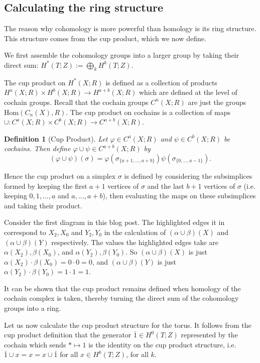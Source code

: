 \documentclass[12pt,a4paper]{article}
\newcommand{\Hom}{\text{Hom}}
\newtheorem{defin}{Definition}
\begin{document}
\subsection*{Calculating the ring structure}
The reason why cohomology is more powerful than homology is its ring structure. This structure comes from the cup product, which we now define.

We first assemble the cohomology groups into a larger group by taking their direct sum: $H^*(T;Z) := \bigoplus_{k} H^k(T;Z)$.

The cup product on $H^*(X;R)$ is defined as a collection of products $H^a(X;R) \times H^b(X;R) \rightarrow H^{a+b}(X;R)$ which are defined at the level of cochain groups. Recall that the cochain groups $C^n(X;R)$ are just the groups $\Hom(C_n(X),R)$. The cup product on cochains is a collection of maps $\cup : C^a(X;R) \times C^b(X;R) \rightarrow C^{a + b}(X;R)$.

\begin{defin}[Cup Product]
  Let $\varphi \in C^a(X;R)$ and $\psi \in C^b(X;R)$ be cochains. Then define $\varphi \cup \psi \in C^{a + b}(X;R)$ by
  \[
  (\varphi \cup \psi)(\sigma) = \varphi(\sigma_{\{a+1,\ldots,a + b\}})\psi(\sigma_{\{0,\ldots, a - 1\}}). 
  \]
\end{defin}

Hence the cup product on a simplex $\sigma$ is defined by considering the subsimplices formed by keeping the first $a + 1$
vertices of $\sigma$ and the last $b + 1$ vertices of $\sigma$ (i.e. keeping $0,1,...,a$ and $a,...,a+b$), then evaluating the maps on these subsimplices and taking their product.

Consider the first diagram in this blog post. The highlighted edges it in correspond to $X_2, X_0$ and $Y_2,Y_0$ in the calculation of $(\alpha \cup \beta)(X)$ and $(\alpha \cup \beta)(Y)$ respectively. The values the highlighted edges take are $\alpha(X_2), \beta(X_0)$, and $\alpha(Y_2), \beta(Y_0)$. So $(\alpha \cup \beta)(X)$ is just $\alpha(X_2) \cdot \beta(X_0) = 0 \cdot 0 = 0$, and $(\alpha \cup \beta)(Y)$ is just $\alpha(Y_2) \cdot \beta(Y_0) = 1 \cdot 1 = 1$.

It can be shown that the cup product remains defined when homology of the cochain complex is taken, thereby turning the direct sum of the cohomology groups into a ring.

Let us now calculate the cup product structure for the torus. It follows from the cup product definition that the generator $\bar 1 \in H^0(T;Z)$ represented by the cochain which sends $* \mapsto 1$ is the identity on the cup product structure, i.e. $\bar 1 \cup x = x = x \cup \bar 1$ for all $x \in H^k(T;Z)$, for all $k$.
\end{document}
